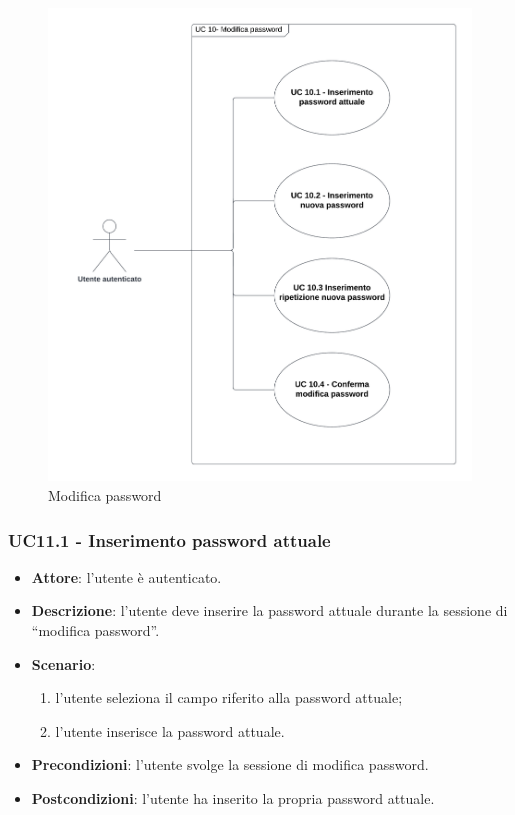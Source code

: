 \begin{figure}[!h]
    \includegraphics[width=15cm]{sezioni/Images/UC10_s.png}
    \centering
    \caption{Modifica password}
\end{figure}

\subsubsection{UC11.1 - Inserimento password attuale} 
\begin{itemize}
    \item \textbf{Attore}: l'utente è autenticato.
    \item \textbf{Descrizione}: l'utente deve inserire la password attuale durante la sessione di “modifica password”.
    \item \textbf{Scenario}:
    \begin{enumerate}
        \item l'utente seleziona il campo riferito alla password attuale;
        \item l'utente inserisce la password attuale.
    \end{enumerate}

    \item \textbf{Precondizioni}: l'utente svolge la sessione di modifica password.
    \item \textbf{Postcondizioni}: l'utente ha inserito la propria password attuale.

\end{itemize}

